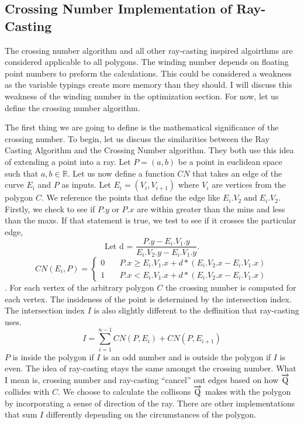 \documentclass{article}
\begin{document}
\subsection{Crossing Number Implementation of Ray-Casting}
The crossing number algorithm and all other ray-casting inspired algoirthms are considered applicable to all polygons\cite{arb_polys}.
The winding number depends on floating point numbers to preform the calculations\cite{arb_polys}.
This could be considered a weakness as the variable typings create more memory than they should.
I will discuss this weakness of the winding number in the optimization section.
For now, let us define the crossing number algorithm.

The first thing we are going to define is the mathematical significance of the crossing number.
To begin, let us discuss the similarities between the Ray Casting Algorithm and the Crossing Number algorithm.
They both use this idea of extending a point into a ray.
Let $P=(a,b)$ be a point in euclidean space such that $a,b\in \mathbb{R}$.
Let us now define a function $CN$ that takes an edge of the curve $E_i$ and $P$ as inputs.
Let $E_i = (V_i, V_{i+1})$ where $V_i$ are vertices from the polygon $C$.
We reference the points that define the edge like $E_i.V_2 \; \textrm{and} \; E_i.V_2$.
Firstly, we check to see if $P.y$ or $P.x$ are within greater than the mins and less than the maxs.
If that statement is true, we test to see if it crosses the particular edge,
$$
    \textrm{Let d = $\frac{P.y-E_i.V_1.y}{E_{i}.V_2.y - E_i.V_1.y}$.}
$$
$$
    CN(E_i,P) =\left\{
                \begin{array}{ll}
                    0 & \quad  P.x \geq E_i.V_1.x + d*(E_i.V_2.x - E_i.V_1.x)\\
                    1 & \quad P.x < E_i.V_1.x + d*(E_i.V_2.x - E_i.V_1.x)
                \end{array}
            \right.
$$.
For each vertex of the arbitrary polygon $C$ the crossing number is computed for each vertex.
The insideness of the point is determined by the intersection index.
The intersection index $I$ is also slightly different to the deffinition that ray-casting uses.
$$
    I = \sum_{i=1}^{n-1} CN(P,E_i) + CN(P, E_{i+1})
$$
$P$ is inside the polygon if $I$ is an odd number and is outside the polygon if $I$ is even.
The idea of ray-casting stays the same amongst the crossing number.
What I mean is, crossing number and ray-casting ``cancel'' out edges based on how $\overrightarrow{\rm Q}$ collides with $C$.
We choose to calculate the collisons $\overrightarrow{\rm Q}$ makes with the polygon by incorporating a sense of direction of the ray.
There are other implementations that sum $I$ differently depending on the circumstances of the polygon.
\end{document}

